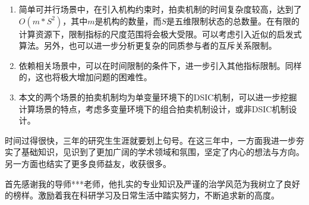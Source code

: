 \documentclass[promaster]{thesis-uestc}
\begin{document}
\begin{enumerate}
    \item 简单可并行场景中，在引入机构约束时，拍卖机制的时间复杂度较高，达到了$O(m*S^2)$，其中$m$是机构的数量，而$S$是五维限制状态的总数量。在有限的计算资源下，限制指标的尺度范围将会极大受限。可以考虑引入近似的启发式算法。另外，也可以进一步分析更复杂的同质参与者的互斥关系限制。
    \item 依赖相关场景中，可以在时间限制的条件下，进一步引入其他指标限制。同样的，这也将极大增加问题的困难性。
    \item 本文的两个场景的拍卖机制均为单变量环境下的DSIC机制，可以进一步挖掘计算场景的特点，考虑多变量环境下的组合拍卖机制设计，或非DSIC机制设计。
\end{enumerate}


%
%
%
%
%
%
%


\thesisacknowledgement

时间过得很快，三年的研究生生涯就要划上句号。在这三年中，一方面我进一步夯实了基础知识，见识到了更加广阔的学术领域和氛围，坚定了内心的想法与方向。另一方面也结实了更多良师益友，收获很多。

首先感谢我的导师***老师，他扎实的专业知识及严谨的治学风范为我树立了良好的榜样。激励着我在科研学习及日常生活中踏实努力，不断追求新的高度。
\end{document}
